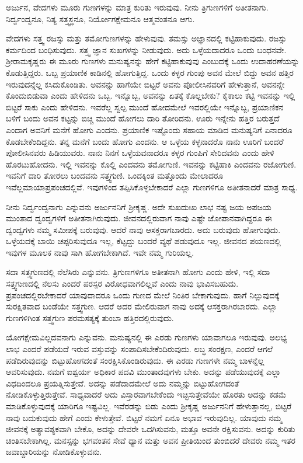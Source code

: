 \begin{artha}
ಅರ್ಜುನ, ವೇದಗಳು ಮೂರು ಗುಣಗಳನ್ನು ಮಾತ್ರ ಕುರಿತು ಇರುವುವು. ನೀನು ತ್ರಿಗುಣಗಳಿಗೆ ಅತೀತನಾಗು. ನಿರ್ದ್ವಂದ್ವನೂ, ನಿತ್ಯ ಸತ್ತ್ವಸ್ಥನೂ, ನಿರ್ಯೋಗಕ್ಷೇಮನೂ ಆತ್ಮವಂತನೂ ಆಗು.
\end{artha}

ವೇದಗಳು ಸತ್ತ್ವ ರಜಸ್ಸು ಮತ್ತು ತಮೋಗುಣಗಳನ್ನು ಹೇಳುವುವು. ತಮಸ್ಸು ಅಜ್ಞಾನದಲ್ಲಿ ಕಟ್ಟಿಹಾಕುವುದು. ರಜಸ್ಸು ಕರ್ಮದಿಂದ ಬಂಧಿಸುವುದು. ಸತ್ತ್ವ ಜ್ಞಾನ ಸುಖಗಳನ್ನು ನೀಡುವುದು. ಅದು ಒಳ್ಳೆಯದಾದರೂ ಒಂದು ಬಂಧನವೇ. ಶ‍್ರೀರಾಮಕೃಷ್ಣರು ಈ ಮೂರು ಗುಣಗಳು ಮನುಷ್ಯನನ್ನು ಹೇಗೆ ಕಟ್ಟಿಹಾಕುವುವು ಎಂಬುದಕ್ಕೆ ಒಂದು ಉದಾಹರಣೆಯನ್ನು ಕೊಡುತ್ತಿದ್ದರು. ಒಬ್ಬ ಪ್ರಯಾಣಿಕ ಕಾಡಿನಲ್ಲಿ ಹೋಗುತ್ತಿದ್ದ. ಒಂದು ಕಳ್ಳರ ಗುಂಪು ಅವನ ಮೇಲೆ ಬಿದ್ದು ಅವನ ಹತ್ತಿರ ಇರುವುದನ್ನೆಲ್ಲ ಕಸಿದುಕೊಂಡಿತು. ಅವನನ್ನು ಹಾಗೆಯೇ ಬಿಟ್ಟರೆ ಅವನು ಪೋಲೀಸಿನವರಿಗೆ ಹೇಳುತ್ತಾನೆ, ಅವನನ್ನೇ ಕೊಂದುಬಿಡುವಾ ಎಂದು ಹೇಳಿದನು ಒಬ್ಬ. ಇನ್ನೊಬ್ಬ, ಅವನನ್ನು ಏತಕ್ಕೆ ಕೊಲ್ಲಬೇಕು? ಕೈಕಾಲು ಕಟ್ಟಿ ಇವನನ್ನು ಇಲ್ಲಿ ಬಿಟ್ಟರೆ ಸಾಕು ಎಂದು ಹೇಳಿದನು. ಇವರೆಲ್ಲ ಸ್ವಲ್ಪ ಮುಂದೆ ಹೋದಮೇಲೆ ಇವರಲ್ಲಿಯೇ ಇನ್ನೊಬ್ಬ, ಪ್ರಯಾಣಿಕನ ಬಳಿಗೆ ಬಂದು ಅವನ ಕಟ್ಟನ್ನು ಬಿಚ್ಚಿ ಮುಂದೆ ಹೋಗಲು ದಾರಿ ತೋರಿದನು. ಊರು ಇನ್ನೇನು ಹತ್ತಿರ ಬರುತ್ತದೆ ಎಂದಾಗ ಅವನಿಗೆ ಮನೆಗೆ ಹೋಗು ಎಂದನು. ಪ್ರಯಾಣಿಕ ಇಷ್ಟೊಂದು ಸಹಾಯ ಮಾಡಿದ ಮನುಷ್ಯನಿಗೆ ಏನಾದರೂ ಕೊಡಬೇಕೆಂದಿದ್ದನು. ತನ್ನ ಮನೆಗೆ ಬಂದು ಹೋಗು ಎಂದನು. ಆ ಒಳ್ಳೆಯ ಕಳ್ಳನಾದರೊ ನಾನು ಊರಿಗೆ ಬಂದರೆ ಪೋಲೀಸಿನವರು ಹಿಡಿಯುವರು. ನಾನು ನಿನಗೆ ಒಳ್ಳೆಯವನಾದರೂ ಕಳ್ಳರ ಗುಂಪಿಗೆ ಸೇರಿದವನು ಎಂದು ಹೇಳಿ ಹೊರಟುಹೋದನು. ಇಲ್ಲಿ ಇವನನ್ನು ಕೊಲ್ಲಿ ಎಂದವನು ತಮೋಗುಣಿ. ಇವನನ್ನು ಕಟ್ಟಿಹಾಕಿ ಎಂದವನು ರಜೋಗುಣಿ. ಇವನಿಗೆ ದಾರಿ ತೋರಲು ಬಂದವನು ಸತ್ತ್ವಗುಣಿ. ಒಂದಕ್ಕಿಂತ ಮತ್ತೊಂದು ಮೇಲಾದರೂ ಇವೆಲ್ಲಮಾಯಾಪ್ರಪಂಚದಲ್ಲಿವೆ. ಇವುಗಳಿಂದ ತಪ್ಪಿಸಿಕೊಳ್ಳಬೇಕಾದರೆ ಎಲ್ಲಾ ಗುಣಗಳಿಗೂ ಅತೀತನಾದರೆ ಮಾತ್ರ ಸಾಧ್ಯ.

ನೀನು ನಿರ್ದ್ವಂದ್ವನಾಗು ಎನ್ನುವನು ಅರ್ಜುನನಿಗೆ ಶ‍್ರೀಕೃಷ್ಣ. ಅದೇ ಸುಖದುಃಖ ಲಾಭ ನಷ್ಟ ಜಯ ಅಪಜಯ ಮುಂತಾದ ದ್ವಂದ್ವಗಳಿಗೆ ಅತೀತನಾಗಿರುವುದು. ಜೀವನದಲ್ಲಿರುವಾಗ ನಾವು ಎಷ್ಟೇ ಜೋಪಾನವಾಗಿದ್ದರೂ ಈ ದ್ವಂದ್ವಗಳು ನಮ್ಮ ಸಮೀಪಕ್ಕೆ ಬರುವುವು. ಆದರೆ ನಾವು ಆಸಕ್ತರಾಗಬಾರದು. ಅದು ಬರುವುದು ಹೋಗುವುದು. ಒಳ್ಳೆಯದಕ್ಕೆ ಬಾಯಿ ಚಪ್ಪರಿಸುವುದೂ ಇಲ್ಲ, ಕೆಟ್ಟದ್ದು ಬಂದರೆ ವ್ಯಥೆ ಪಡುವುದೂ ಇಲ್ಲ. ಜೀವನದ ಪಯಣದಲ್ಲಿ ಇವುಗಳ ಮೂಲಕ ನಾವು ಸಾಗಿ ಹೋಗಬೇಕಾಗಿದೆ. ಇವೇ ನಮ್ಮ ಗುರಿಯಲ್ಲ.

ಸದಾ ಸತ್ತ್ವಗುಣದಲ್ಲಿ ನೆಲೆಸಿರು ಎನ್ನುವನು. ತ್ರಿಗುಣಗಳಿಗೂ ಅತೀತನಾಗಿ ಹೋಗು ಎಂದು ಹೇಳಿ, ಇಲ್ಲಿ ಸದಾ ಸತ್ತ್ವಗುಣದಲ್ಲಿ ನೆಲಸು ಎಂದರೆ ಪರಸ್ಪರ ವಿರೋಧವಾಗಲಿಲ್ಲವೆ ಎಂದು ನಾವು ಭಾವಿಸಬಹುದು. ಪ್ರಪಂಚದಲ್ಲಿರಬೇಕಾದರೆ ಯಾವುದಾದರೂ ಒಂದು ಗುಣದ ಮೇಲೆ ನಿಂತಿರ ಬೇಕಾಗುವುದು. ಹಾಗೆ ನಿಲ್ಲುವುದಕ್ಕೆ ಸುರಕ್ಷಿತವಾದ ಬಂಡೆಯೇ ಸತ್ತ್ವಗುಣ. ಆದರೆ ಅದರ ಮೇಲಿರುವಾಗ ನಾವು ಅದಕ್ಕೆ ಆಸಕ್ತರಾಗಿರಬಾರದು. ಎಲ್ಲಾ ಗುಣಗಳಿಗಿಂತ ಸತ್ತ್ವಗುಣ ಪರಮಸತ್ಯಕ್ಕೆ ತುಂಬಾ ಹತ್ತಿರದಲ್ಲಿರುವುದು.

ಯೋಗಕ್ಷೇಮವಿಲ್ಲದವನಾಗು ಎನ್ನುವನು. ಮನುಷ್ಯನಲ್ಲಿ ಈ ಎರಡು ಗುಣಗಳು ಯಾವಾ\-ಗಲೂ ಇರುವುವು. ಅಲಭ್ಯ ಲಾಭ ಎಂದರೆ ಪಡೆಯದೆ ಇರುವ ವಸ್ತುವನ್ನು ಸಂಪಾದಿಸಬೇಕೆಂದಿರುವುದು. ಲಬ್ಧ ಸಂರಕ್ಷಣ, ಎಂದರೆ ಆಗಲೆ ಪಡೆದಿರುವುದನ್ನು ಬಿಟ್ಟುಹೋಗದಂತೆ ಸಂರಕ್ಷಿಸಿ\-ಕೊಂಡಿರುವುದು. ಈ ಎರಡು ಗುಣಗಳೇ ನಮ್ಮ ಬಾಳನ್ನೆಲ್ಲ ಆವರಿಸುವುದು. ನಮಗೆ ಐಶ್ವರ್ಯ ಅಧಿಕಾರ ಪದವಿ ಮುಂತಾದವುಗಳು ಬೇಕು. ಅದನ್ನು ಪಡೆಯುವುದಕ್ಕೆ ಎಲ್ಲಾ ವಿಧದಿಂದಲೂ ಪ್ರಯತ್ನಿಸುತ್ತೇವೆ. ಅದನ್ನು ಪಡೆದಾದಮೇಲೆ ಅದು ನಮ್ಮನ್ನು ಬಿಟ್ಟುಹೋಗದಂತೆ ನೋಡಿಕೊಳ್ಳು\-ತ್ತಿರುತ್ತೇವೆ. ಸಾಧ್ಯವಾದರೆ ಅದು ವಿಸ್ತಾರವಾಗಬೇಕೆಂದು ಇಚ್ಛಿಸುತ್ತೇವೆಯೇ ಹೊರತು ಅದನ್ನು ಕಡಮೆ ಮಾಡಿಕೊಳ್ಳುವುದಕ್ಕೆ ಯಾರಿಗೂ ಇಷ್ಟವಿಲ್ಲ. ಇವೆರಡನ್ನು ಬಿಡು ಎಂದು ಶ‍್ರೀಕೃಷ್ಣ ಅರ್ಜುನನಿಗೆ ಹೇಳುತ್ತಾನಲ್ಲ, ಬಿಟ್ಟರೆ ನಾವು ಬದುಕುವುದು ಹೇಗೆ ಎಂದು ಕೇಳುತ್ತೇವೆ. ಬಿಟ್ಟರೆ ನಮಗೆ ಏನೂ ಅಭಾವ ಇರುವುದಿಲ್ಲ. ಯಾವುದು ನಮ್ಮ ಜೀವನಕ್ಕೆ ಅತ್ಯಾವಶ್ಯಕವಾಗಿ ಬೇಕೊ, ಅದನ್ನು ದೇವರೇ ಒದಗಿಸುವನು, ಮತ್ತೂ ಅವನೇ ರಕ್ಷಿಸುವನು. ಅದನ್ನು ಕುರಿತು ಚಿಂತಿಸಬೇಕಾ\-ಗಿಲ್ಲ. ಮನಸ್ಸನ್ನು ಭಗವಂತನ ಸೇವೆ ಧ್ಯಾನ ಮತ್ತು ಅವನ ಪ್ರೀತಿಯಿಂದ ತುಂಬಿದರೆ ದೇವರು ನಮ್ಮ ಇತರ ಜವಾಬ್ದಾರಿಯನ್ನು ನೋಡಿಕೊಳ್ಳುವನು.

